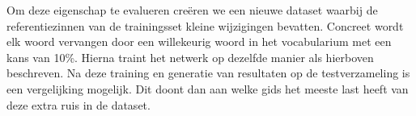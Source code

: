 Om deze eigenschap te evalueren cre\"eren we een nieuwe dataset waarbij de referentiezinnen van de trainingsset kleine wijzigingen bevatten.
Concreet wordt elk woord vervangen door een willekeurig woord in het vocabularium met een kans van 10\%. Hierna traint het netwerk op dezelfde manier als hierboven beschreven. Na deze training en generatie van resultaten op de testverzameling is een vergelijking mogelijk. Dit doont dan aan welke gids het meeste last heeft van deze extra ruis in de dataset.


